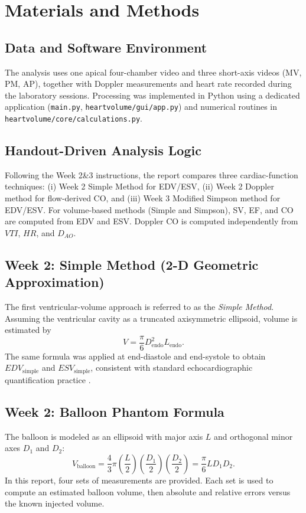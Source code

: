 \section{Materials and Methods}

\subsection{Data and Software Environment}
The analysis uses one apical four-chamber video and three short-axis videos (MV, PM, AP), together with Doppler measurements and heart rate recorded during the laboratory sessions. Processing was implemented in Python using a dedicated application (\texttt{main.py}, \texttt{heartvolume/gui/app.py}) and numerical routines in \texttt{heartvolume/core/calculations.py}.

\subsection{Handout-Driven Analysis Logic}
Following the Week 2\&3 instructions, the report compares three cardiac-function techniques: (i) Week 2 Simple Method for EDV/ESV, (ii) Week 2 Doppler method for flow-derived CO, and (iii) Week 3 Modified Simpson method for EDV/ESV. For volume-based methods (Simple and Simpson), SV, EF, and CO are computed from EDV and ESV. Doppler CO is computed independently from $VTI$, $HR$, and $D_{AO}$.

\subsection{Week 2: Simple Method (2-D Geometric Approximation)}
The first ventricular-volume approach is referred to as the \emph{Simple Method}. Assuming the ventricular cavity as a truncated axisymmetric ellipsoid, volume is estimated by
\begin{equation}
V = \frac{\pi}{6} D_{\mathrm{endo}}^2 L_{\mathrm{endo}}.
\end{equation}
The same formula was applied at end-diastole and end-systole to obtain $EDV_{\mathrm{simple}}$ and $ESV_{\mathrm{simple}}$, consistent with standard echocardiographic quantification practice \cite{schiller1989lv}.

\subsection{Week 2: Balloon Phantom Formula}
The balloon is modeled as an ellipsoid with major axis $L$ and orthogonal minor axes $D_1$ and $D_2$:
\begin{equation}
V_{\mathrm{balloon}} = \frac{4}{3}\pi\left(\frac{L}{2}\right)\left(\frac{D_1}{2}\right)\left(\frac{D_2}{2}\right) = \frac{\pi}{6} L D_1 D_2.
\end{equation}
In this report, four sets of measurements are provided. Each set is used to compute an estimated balloon volume, then absolute and relative errors versus the known injected volume.

